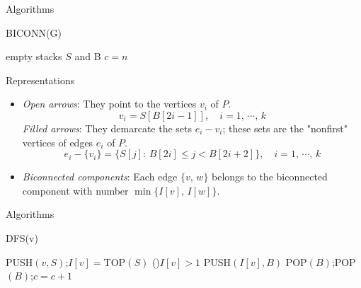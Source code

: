 \documentclass{beamer}
\begin{document}
\begin{frame}{Algorithms}
	\SetAlFnt{\normalsize}
	\begin{procedure}[H]
		\caption{BICONN(G)}
		empty stacks $S$ and B\;
		$c=n$\;
	\end{procedure}
\end{frame}

\begin{frame}{Representations}
	\begin{itemize}
		\item
		\emph{Open arrows}: They point to the vertices $v_i$ of $P$.
		$$v_i=S[B[2i-1]],\quad i=1,\,\cdots,\,k$$
		\emph{Filled arrows}: They demarcate the sets $e_i-v_i$; these sets
		are the "nonfirst" vertices of edges $e_i$ of $P$.
		$$e_i-\{v_i\}=\{S[j]:\,B[2i]\leq j < B[2i+2]\},\quad i=1,\,\cdots,\,k$$
		\item
		\emph{Biconnected components}: Each edge $\{v,\,w\}$ belongs to the
		biconnected component with number $\min\{I[v],\,I[w]\}$.
	\end{itemize}
\end{frame}

\begin{frame}{Algorithms}
	\SetAlFnt{\small}
	\begin{procedure}[H]
		\caption{DFS(v)}
		PUSH$(v,S)$;\quad $I[v]=$TOP$(S)$\;
		\If(){$I[v] > 1$}{
			PUSH$(I[v],B)$\;
		}
		 {
			POP$(B)$;\quad POP$(B)$;\quad $c = c + 1$\;
		}
	\end{procedure}
\end{frame}
\end{document}
